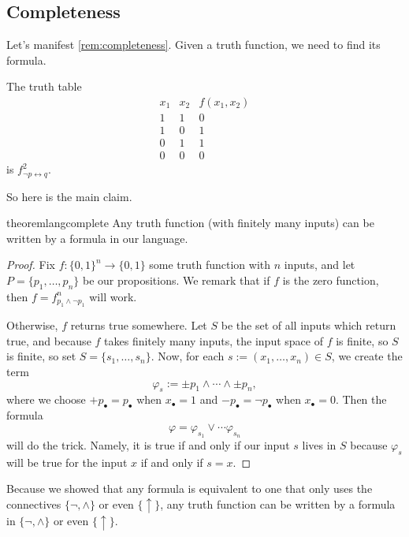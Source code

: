 \documentclass[../notes.tex]{subfiles}
\begin{document}
\subsection{Completeness}
Let's manifest \autoref{rem:completeness}. Given a truth function, we need to find its formula.
\begin{example}
	The truth table
	\[\begin{array}{c|c||c}
		x_1 & x_2 & f(x_1,x_2) \\
		\hline
		1 & 1 & 0 \\
		1 & 0 & 1 \\
		0 & 1 & 1 \\
		0 & 0 & 0
	\end{array}\]
	is $f_{\lnot p\leftrightarrow q}^2$.
\end{example}
So here is the main claim.
\begin{restatable}{theorem}{langcomplete} \label{thm:langcomplete}
	Any truth function (with finitely many inputs) can be written by a formula in our language.
\end{restatable}
\begin{proof}
	Fix $f:\{0,1\}^n\to\{0,1\}$ some truth function with $n$ inputs, and let $P=\{p_1,\ldots,p_n\}$ be our propositions. We remark that if $f$ is the zero function, then $f=f_{p_1\land\lnot p_1}^n$ will work.

	Otherwise, $f$ returns true somewhere. Let $S$ be the set of all inputs which return true, and because $f$ takes finitely many inputs, the input space of $f$ is finite, so $S$ is finite, so set $S=\{s_1,\ldots,s_n\}$. Now, for each $s:=(x_1,\ldots,x_n)\in S$, we create the term
	\[\varphi_s:=\pm p_1\land\cdots\land\pm p_n,\]
	where we choose $+p_\bullet=p_\bullet$ when $x_\bullet=1$ and $-p_\bullet=\lnot p_\bullet$ when $x_\bullet=0$. Then the formula
	\[\varphi=\varphi_{s_1}\lor\cdots\varphi_{s_n}\]
	will do the trick. Namely, it is true if and only if our input $s$ lives in $S$ because $\varphi_s$ will be true for the input $x$ if and only if $s=x$.
\end{proof}
\begin{remark}
	Because we showed that any formula is equivalent to one that only uses the connectives $\{\lnot,\land\}$ or even $\{\uparrow\}$, any truth function can be written by a formula in $\{\lnot,\land\}$ or even $\{\uparrow\}$.
\end{remark}
\end{document}
